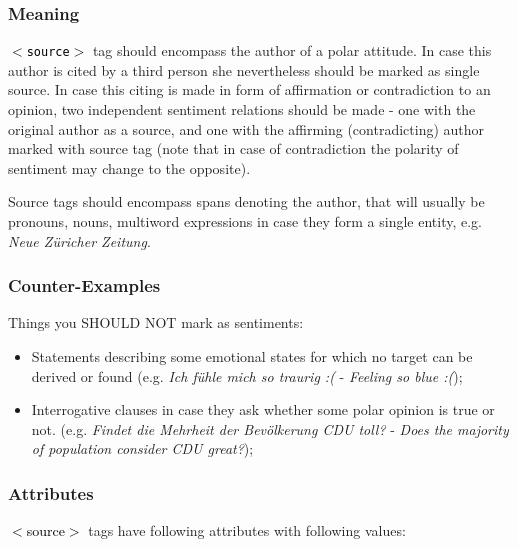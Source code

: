 \documentclass[11pt,a4paper]{article}
\newcommand{\xmltag}[1]{\textcolor{black}{{\small$<$#1$>$}}}
\begin{document}
\subsubsection{Meaning}

\texttt{\xmltag{source}} tag should encompass the author of a polar
attitude. In case this author is cited by a third person she
nevertheless should be marked as single source. In case this citing is
made in form of affirmation or contradiction to an opinion, two
independent sentiment relations should be made - one with the original
author as a source, and one with the affirming (contradicting) author
marked with source tag (note that in case of contradiction the
polarity of sentiment may change to the opposite).

Source tags should encompass spans denoting the author, that will
usually be pronouns, nouns, multiword expressions in case they form a
single entity, e.g. \textit{Neue Z\"uricher Zeitung}.

\subsubsection{Counter-Examples}
Things you SHOULD NOT mark as sentiments:
\begin{itemize}
  \item Statements describing some emotional states for which no
    target can be derived or found (e.g. \textit{Ich f\"uhle mich so
      traurig :(} - \textit{Feeling so blue :(});
  \item Interrogative clauses in case they ask whether some polar
    opinion is true or not. (e.g. \textit{Findet die Mehrheit
      der Bev\"olkerung CDU toll?} - \textit{Does the majority
      of population consider CDU great?});
\end{itemize}


\subsubsection{Attributes}
\xmltag{source} tags have following attributes with following
values:
\end{document}
